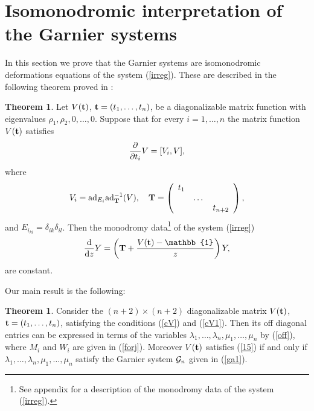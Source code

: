 \documentclass[12pt]{article}
\newcommand{\ID}{\mathbb{1}}
\theoremstyle{definition}
\theoremstyle{theorem}
\newtheorem{thm}[df]{Theorem}
\begin{document}
\section{Isomonodromic interpretation of the Garnier systems}

In this section we prove that the Garnier systems are isomonodromic 
deformations equations of the system (\ref{irreg}). These are described in
the following theorem proved in \cite{MJU,Dub1}:

\begin{thm}
Let $V({\bf t})$, ${\bf t}=(t_1,\dots,t_{n})$, be a diagonalizable matrix 
function with eigenvalues $\rho_1,\rho_2,0,\dots,0$. Suppose that for 
every $i=1,\dots,n$ the matrix function $V({\bf t})$ satisfies
\begin{equation}
{\partial\over\partial t_i}V=[V_i,V],
\label{15}
\end{equation}
where
$$
V_i={\rm ad}_{E_i}{\rm ad}_{\bf T}^{-1}(V),\quad
{\bf T}=\left(\begin{array}{ccc}t_1& & \\ & \dots&\\ & & t_{n+2}
\end{array}\right),
$$
and $E_{i_{kl}}=\delta_{ik}\delta_{il}$. Then the monodromy 
data\footnote{See appendix for a description of the monodromy data of the 
system (\ref{irreg}).} of the system  (\ref{irreg})
$$
{{\rm d}\over{\rm d}z}Y
=\left({\bf T}+{V({\bf{t}})-\ID\over z}\right) Y,
$$
are constant.
\end{thm}

Our main result is the following:

\begin{thm}
Consider the $(n+2)\times(n+2)$ diagonalizable matrix $V({\bf t})$, 
${\bf t}=(t_1,\dots,t_{n})$, satisfying the conditions (\ref{cV})
and (\ref{cV1}). Then its off diagonal entries can be expressed in 
terms of the variables $\lambda_1,\dots,\lambda_n,\mu_1,\dots,\mu_n$ 
by (\ref{off}), where $M_i$ and $W_i$ are given in (\ref{forj}). Moreover
$V({\bf t})$ satisfies (\ref{15}) if and only if 
$\lambda_1,\dots,\lambda_n,\mu_1,
\dots,\mu_n$ satisfy the Garnier system ${\cal G}_n$ given in (\ref{ga1}).
\label{main}\end{thm}
\end{document}
